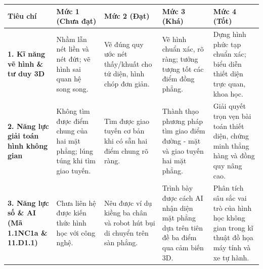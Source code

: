 \documentclass[12pt, a4paper]{article}
\begin{document}
\begin{center}
\begin{tabularx}{\linewidth}{|p{3.2cm}|X|X|X|X|}
\hline
\textbf{Tiêu chí} & \textbf{Mức 1 (Chưa đạt)} & \textbf{Mức 2 (Đạt)} & \textbf{Mức 3 (Khá)} & \textbf{Mức 4 (Tốt)} \\
\hline
\textbf{1. Kĩ năng vẽ hình \& tư duy 3D} & Nhầm lẫn nét liền và nét đứt; vẽ hình sai quan hệ song song. & Vẽ đúng quy ước nét thấy/khuất cho tứ diện, hình chóp đơn giản. & Vẽ hình chuẩn xác, rõ ràng; tưởng tượng tốt các điểm đồng phẳng. & Dựng hình phức tạp chuẩn xác; biểu diễn thiết diện trực quan, khoa học. \\
\hline
\textbf{2. Năng lực giải toán hình không gian} & Không tìm được điểm chung của hai mặt phẳng; lúng túng khi tìm giao tuyến. & Tìm được giao tuyến cơ bản khi có sẵn hai điểm chung rõ ràng. & Thành thạo phương pháp tìm giao điểm đường - mặt và giao tuyến hai mặt phẳng. & Giải quyết trọn vẹn bài toán thiết diện, chứng minh thẳng hàng và đồng quy nâng cao. \\
\hline
\textbf{3. Năng lực số \& AI (Mã 1.1NC1a \& 11.D1.1)} & Chưa liên hệ được kiến thức hình học với công nghệ. & Nêu được ví dụ kiềng ba chân và robot hút bụi di chuyển trên sàn phẳng. & Trình bày được cách AI nhận diện mặt phẳng dựa trên tiên đề ba điểm qua cảm biến 3D. & Phân tích sâu sắc vai trò của hình học không gian trong kĩ thuật đồ họa máy tính và xe tự hành. \\
\hline
\end{tabularx}
\end{center}
\end{document}
